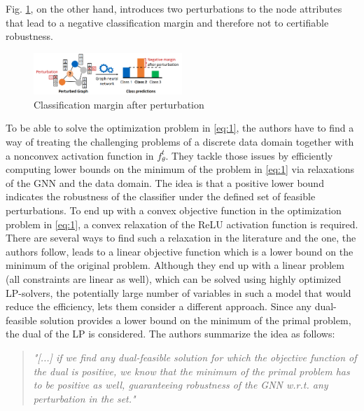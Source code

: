 \documentclass[a4paper,preprint]{sig-alternate}
\begin{document}
Fig. \ref{fig:after_pert}, on the other hand, introduces two perturbations to the node attributes that lead to a negative
classification margin and therefore not to certifiable robustness.

\vfill
\pagebreak

\begin{figure}[h]
    \centering
    \includegraphics[width=0.5\textwidth]{img/after_pert.png}
    \caption{Classification margin after perturbation \cite{Zuegner_2019}}
    \label{fig:after_pert}
\end{figure}

To be able to solve the optimization problem in \ref{eq:1}, the authors have to find a way of treating the challenging
problems of a discrete data domain together with a nonconvex activation function in $f_{\theta}^t$. \cite{Zuegner_2019}
They tackle those issues by efficiently computing lower bounds on the minimum of the problem in \ref{eq:1} via relaxations 
of the GNN and the data domain. The idea is that a positive lower bound indicates the robustness of the classifier under 
the defined set of feasible perturbations.
To end up with a convex objective function in the optimization problem in \ref{eq:1}, a convex relaxation of the ReLU activation
function is required. \cite{Zuegner_2019} There are several ways to find such a relaxation in the literature and the one, the authors follow,
leads to a linear objective function which is a lower bound on the minimum of the original problem.
Although they end up with a linear problem (all constraints are linear as well), which can be solved using highly optimized LP-solvers,
the potentially large number of variables in such a model that would reduce the efficiency, lets them consider a different approach.
Since any dual-feasible solution provides a lower bound on the minimum of the primal problem, the dual of the LP is considered. \cite{Zuegner_2019}
The authors summarize the idea as follows:
\begin{quote}
    \emph{"[...] if we find any dual-feasible solution for which the objective function of the dual is positive, we know that the minimum of 
    the primal problem has to be positive as well, guaranteeing robustness of the GNN w.r.t. any perturbation in the set."} \cite{Zuegner_2019}
\end{quote}
\end{document}

